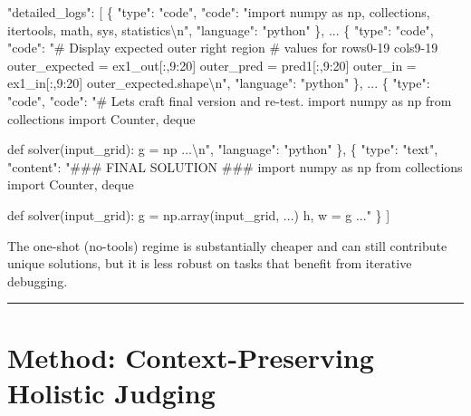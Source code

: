 \documentclass[11pt]{article}
\newenvironment{Shaded}{}{}
\newcommand{\NormalTok}[1]{#1}
\begin{document}
\begin{Shaded}
\begin{Highlighting}[]
\NormalTok{"detailed\_logs": [}
\NormalTok{  \{}
\NormalTok{    "type": "code",}
\NormalTok{    "code": "import numpy as np, collections,}
\NormalTok{             itertools, math, sys, statistics\textbackslash{}n",}
\NormalTok{    "language": "python"}
\NormalTok{  \},}
\NormalTok{  ...}
\NormalTok{  \{}
\NormalTok{    "type": "code",}
\NormalTok{    "code": "\# Display expected outer right region}
\NormalTok{             \# values for rows0{-}19 cols9{-}19}
\NormalTok{             outer\_expected = ex1\_out[:,9:20]}
\NormalTok{             outer\_pred = pred1[:,9:20]}
\NormalTok{             outer\_in = ex1\_in[:,9:20]}
\NormalTok{             outer\_expected.shape\textbackslash{}n",}
\NormalTok{    "language": "python"}
\NormalTok{  \},}
\NormalTok{  ...}
\NormalTok{  \{}
\NormalTok{    "type": "code",}
\NormalTok{    "code": "\# Let\textquotesingle{}s craft final version and re{-}test.}
\NormalTok{             import numpy as np}
\NormalTok{             from collections import Counter, deque}

\NormalTok{             def solver(input\_grid):}
\NormalTok{                 g = np ...\textbackslash{}n",}
\NormalTok{    "language": "python"}
\NormalTok{  \},}
\NormalTok{  \{}
\NormalTok{    "type": "text",}
\NormalTok{    "content": "\#\#\# FINAL SOLUTION \#\#\#}
\NormalTok{               import numpy as np}
\NormalTok{               from collections import Counter, deque}

\NormalTok{               def solver(input\_grid):}
\NormalTok{                   g = np.array(input\_grid, ...)}
\NormalTok{                   h, w = g ..."}
\NormalTok{  \}}
\NormalTok{]}
\end{Highlighting}
\end{Shaded}

The one-shot (no-tools) regime is substantially cheaper and can still
contribute unique solutions, but it is less robust on tasks that benefit
from iterative debugging.

\begin{center}\rule{0.5\linewidth}{0.5pt}\end{center}

\hypertarget{method-context-preserving-holistic-judging}{%
\section{Method: Context-Preserving Holistic
Judging}\label{method-context-preserving-holistic-judging}}
\end{document}
